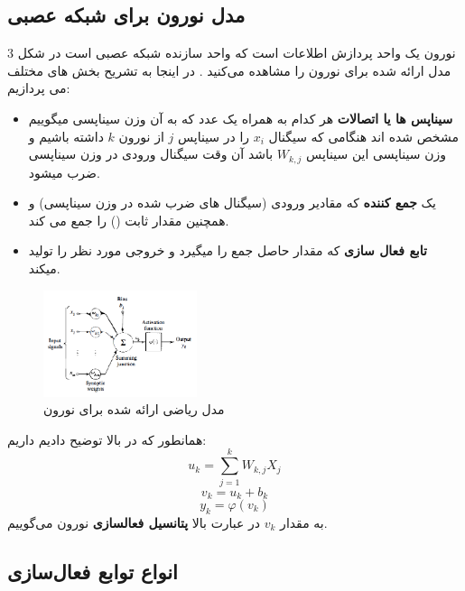 \documentclass[11pt,a4paper,twocolumn]{article}
\begin{document}
\subsection{مدل نورون برای شبکه عصبی}
	نورون یک واحد پردازش اطلاعات است که واحد سازنده شبکه عصبی است در شکل 3 مدل ارائه شده برای نورون را مشاهده می‌کنید . در اینجا به تشریح بخش های مختلف می پردازیم:
\begin{itemize}
\item
\textbf{سیناپس ها یا اتصالات}
هر کدام به همراه یک عدد که به آن وزن سیناپسی میگوییم مشخص شده اند هنگامی که سیگنال
$x_i$
را در سیناپس
$j$
از نورون
$k$
داشته باشیم و وزن سیناپسی این سیناپس
$W_{k,j}$
باشد آن وقت سیگنال ورودی در وزن سیناپسی ضرب میشود.
\item
یک \textbf{جمع کننده}  که مقادیر ورودی (سیگنال های ضرب شده در وزن سیناپسی) و همچنین مقدار ثابت () را جمع می کند.
\item
\textbf{تابع فعال سازی}
که مقدار حاصل جمع را میگیرد و خروجی مورد نظر را تولید میکند.	
\end{itemize}

\begin{figure}
  \centering
    \includegraphics[width=0.4\textwidth]{neuron.png}
  \caption{مدل ریاضی ارائه شده برای نورون}
  \label{fig:neuron}
\end{figure}

همانطور که در بالا توضیح دادیم داریم:
$$u_k = \sum_{j=1}^{k}{W_{k,j}X_j}$$
$$v_k = u_k + b_k$$
$$y_k = \varphi(v_k)$$
به مقدار $v_k$ در عبارت بالا
\textbf{پتانسیل فعالسازی}
نورون می‌گوییم.

\subsection{انواع توابع فعال‌سازی}
\label{sec:activation}
\end{document}
